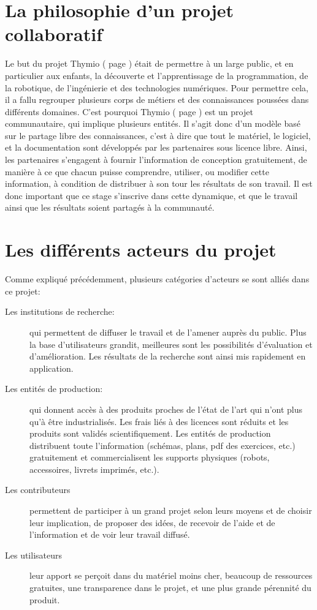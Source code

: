 \documentclass[a4paper, 12pt]{report}
\begin{document}
\section{La philosophie d'un projet collaboratif \cite{PhiloThymio} }
\label{PhiloThymio}
Le but du projet Thymio ( page \pageref{thymio} ) était de permettre à un large public, et en particulier aux enfants, la découverte et l'apprentissage de la programmation, de la robotique, de l'ingénierie et des technologies numériques. Pour permettre cela, il a fallu regrouper plusieurs corps de métiers et des connaissances poussées dans différents domaines. C'est pourquoi Thymio ( page \pageref{thymio} ) est un projet communautaire, qui implique plusieurs entités. Il s'agit donc d'un modèle basé sur le partage libre des connaissances, c'est à dire que tout le matériel, le logiciel, et la documentation sont développés par les partenaires sous licence libre. Ainsi, les partenaires s'engagent à fournir l'information de conception gratuitement, de manière à ce que chacun puisse comprendre, utiliser, ou modifier cette information, à condition de distribuer à son tour les résultats de son travail. Il est donc important que ce stage s'inscrive dans cette dynamique, et que le travail ainsi que les résultats soient partagés à la communauté.

\section{Les différents acteurs du projet}
Comme expliqué précédemment, plusieurs catégories d'acteurs se sont alliés dans ce projet:
\begin{description}
\item[Les institutions de recherche: ]qui permettent de diffuser le travail et de l'amener auprès du public. Plus la base d'utilisateurs grandit, meilleures sont les possibilités d'évaluation et d'amélioration. Les résultats de la recherche sont ainsi mis rapidement en application.
\item[Les entités de production: ] qui donnent accès à des produits proches de l'état de l'art qui n'ont plus qu'à être industrialisés. Les frais liés à des licences sont réduits et les produits sont validés scientifiquement. Les entités de production distribuent toute l'information (schémas, plans, pdf des exercices, etc.) gratuitement et commercialisent les supports physiques (robots, accessoires, livrets imprimés, etc.).
\item[Les contributeurs] permettent de participer à un grand projet selon leurs moyens et de choisir leur implication, de proposer des idées, de recevoir de l'aide et de l'information et de voir leur travail diffusé.
\item[Les utilisateurs] leur apport se perçoit dans du matériel moins cher, beaucoup de ressources gratuites, une transparence dans le projet, et une plus grande pérennité du produit.
\end{description}
\end{document}
